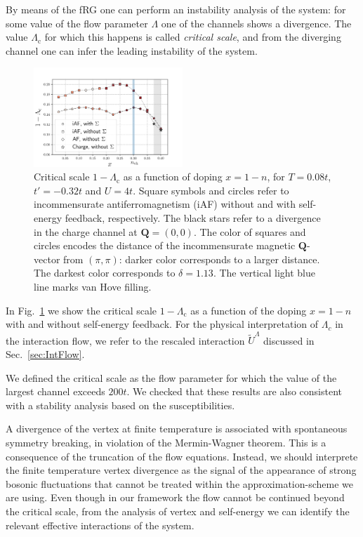 By means of the fRG one can perform an instability analysis of the system: 
for some value of the flow parameter $\Lambda$ one of the channels shows a divergence. 
The value $\Lambda_{\mathrm{c}} $ for which this happens is called \textit{critical scale}, and from the diverging channel one can infer the leading instability of the system. 
%
\begin{figure}
\includegraphics[width=0.5\textwidth]{images/phasediag.png}
\caption{Critical scale $1-\Lambda_{\mathrm{c}}$ as a function of doping $x=1-n$, for $T = 0.08t$, $t'=-0.32t$ and $U=4t$. 
Square symbols and circles refer to incommensurate antiferromagnetism (iAF) without and with self-energy feedback, respectively.
The black stars refer to a divergence in the charge channel at $\mathbf{Q} = (0,0)$.
The color of squares and circles encodes the distance of the incommensurate magnetic $\mathbf{Q}$-vector from $(\pi,\pi)$: darker color corresponds to a larger distance. The darkest color corresponds to $\delta=1.13$. 
The vertical light blue line marks van Hove filling.}  
\label{fig:criscale} 
\end{figure}
%
In Fig.~\ref{fig:criscale} we show the critical scale $1-\Lambda_{\mathrm{c}}$ as a function of the doping $x=1-n$ with and without self-energy feedback.
For the physical interpretation of $\Lambda_c$ in the interaction flow, we refer to the rescaled interaction\cite{Honerkamp2004} $\tilde U ^\Lambda$ discussed in Sec.~\ref{sec:IntFlow}.  

We defined the critical scale as the flow parameter for which the value of the largest channel exceeds $200t$. We checked that these results are also consistent with a stability analysis based on the susceptibilities.        

A divergence of the vertex at finite temperature is associated with spontaneous symmetry breaking, in violation of the Mermin-Wagner theorem.\cite{Mermin1966}
This is a consequence of the truncation of the flow equations.
Instead, we should interprete the finite temperature vertex divergence as the signal of the appearance of strong bosonic fluctuations that cannot be treated within the approximation-scheme we are using.\cite{Salmhofer2001} 
Even though in our framework the flow cannot be continued beyond the critical scale, from the analysis of vertex and self-energy we can identify the relevant effective interactions of the system.

